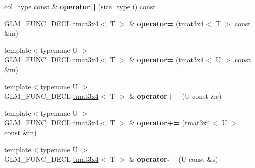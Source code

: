 \begin{DoxyCompactItemize}
\item 
\hypertarget{structglm_1_1detail_1_1tmat3x4_a7dc21a8cdc3498009633e48e4b97a103}{\hyperlink{structglm_1_1detail_1_1tvec4}{col\-\_\-type} const \& {\bfseries operator\mbox{[}$\,$\mbox{]}} (size\-\_\-type i) const }\label{structglm_1_1detail_1_1tmat3x4_a7dc21a8cdc3498009633e48e4b97a103}

\item 
\hypertarget{structglm_1_1detail_1_1tmat3x4_af9f94eb464f772e0a67f29e87bb70fd4}{G\-L\-M\-\_\-\-F\-U\-N\-C\-\_\-\-D\-E\-C\-L \hyperlink{structglm_1_1detail_1_1tmat3x4}{tmat3x4}$<$ T $>$ \& {\bfseries operator=} (\hyperlink{structglm_1_1detail_1_1tmat3x4}{tmat3x4}$<$ T $>$ const \&m)}\label{structglm_1_1detail_1_1tmat3x4_af9f94eb464f772e0a67f29e87bb70fd4}

\item 
\hypertarget{structglm_1_1detail_1_1tmat3x4_a3fd57a85c46c046df5968b92f31f7119}{{\footnotesize template$<$typename U $>$ }\\G\-L\-M\-\_\-\-F\-U\-N\-C\-\_\-\-D\-E\-C\-L \hyperlink{structglm_1_1detail_1_1tmat3x4}{tmat3x4}$<$ T $>$ \& {\bfseries operator=} (\hyperlink{structglm_1_1detail_1_1tmat3x4}{tmat3x4}$<$ U $>$ const \&m)}\label{structglm_1_1detail_1_1tmat3x4_a3fd57a85c46c046df5968b92f31f7119}

\item 
\hypertarget{structglm_1_1detail_1_1tmat3x4_a34ad07821ef734e30238c6ed41cf46e6}{{\footnotesize template$<$typename U $>$ }\\G\-L\-M\-\_\-\-F\-U\-N\-C\-\_\-\-D\-E\-C\-L \hyperlink{structglm_1_1detail_1_1tmat3x4}{tmat3x4}$<$ T $>$ \& {\bfseries operator+=} (U const \&s)}\label{structglm_1_1detail_1_1tmat3x4_a34ad07821ef734e30238c6ed41cf46e6}

\item 
\hypertarget{structglm_1_1detail_1_1tmat3x4_ac16e51e1eae4d6f74d292d182df2384f}{{\footnotesize template$<$typename U $>$ }\\G\-L\-M\-\_\-\-F\-U\-N\-C\-\_\-\-D\-E\-C\-L \hyperlink{structglm_1_1detail_1_1tmat3x4}{tmat3x4}$<$ T $>$ \& {\bfseries operator+=} (\hyperlink{structglm_1_1detail_1_1tmat3x4}{tmat3x4}$<$ U $>$ const \&m)}\label{structglm_1_1detail_1_1tmat3x4_ac16e51e1eae4d6f74d292d182df2384f}

\item 
\hypertarget{structglm_1_1detail_1_1tmat3x4_aabdd4dd5d7d0037d515833961ac0a72c}{{\footnotesize template$<$typename U $>$ }\\G\-L\-M\-\_\-\-F\-U\-N\-C\-\_\-\-D\-E\-C\-L \hyperlink{structglm_1_1detail_1_1tmat3x4}{tmat3x4}$<$ T $>$ \& {\bfseries operator-\/=} (U const \&s)}\label{structglm_1_1detail_1_1tmat3x4_aabdd4dd5d7d0037d515833961ac0a72c}


\end{DoxyCompactItemize}
